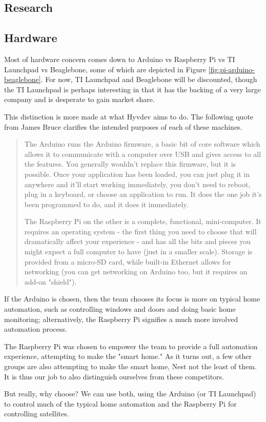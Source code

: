 \begin{multicols}{2}		


\section{Research}

	\subsection{Hardware}
	
		Most of hardware concern comes down to Arduino vs Raspberry Pi vs TI Launchpad vs Beaglebone, some of which are depicted in Figure \ref{fig:pi-arduino-beaglebone}. 
		For now, TI Launchpad and Beaglebone will be discounted, though the TI Launchpad is perhaps interesting in that it has the backing of a very large company and is desperate to gain market share.
		
		This distinction is more made at what Hyvdev aims to do.
		The following quote from James Bruce clarifies the intended purposes of each of these machines.
		
		\begin{quote}
			The Arduino runs the Arduino firmware, a basic bit of core software which allows it to communicate with a computer over USB and gives access to all the features. You generally wouldn't replace this firmware, but it is possible. Once your application has been loaded, you can just plug it in anywhere and it'll start working immediately, you don't need to reboot, plug in a keyboard, or choose an application to run. It does the one job it's been programmed to do, and it does it immediately.
			
			The Raspberry Pi on the other is a complete, functional, mini-computer. It requires an operating system - the first thing you need to choose that will dramatically affect your experience - and has all the bits and pieces you might expect a full computer to have (just in a smaller scale). Storage is provided from a micro-SD card, while built-in Ethernet allows for networking (you can get networking on Arduino too, but it requires an add-on "shield").
		\end{quote}
		
		If the Arduino is chosen, then the team chooses its focus is more on typical home automation, such as controlling windows and doors and doing basic home monitoring; alternatively, the Raspberry Pi signifies a much more involved automation process.
		
		The Raspberry Pi was chosen to empower the team to provide a full automation experience, attempting to make the "smart home."
		As it turns out, a few other groups are also attempting to make the smart home, Nest not the least of them.
		It is thus our job to also distinguish ourselves from these competitors.
		
		But really, why choose?
		We can use both, using the Arduino (or TI Launchpad) to control much of the typical home automation and the Raspberry Pi for controlling satellites.
		
\end{multicols}
